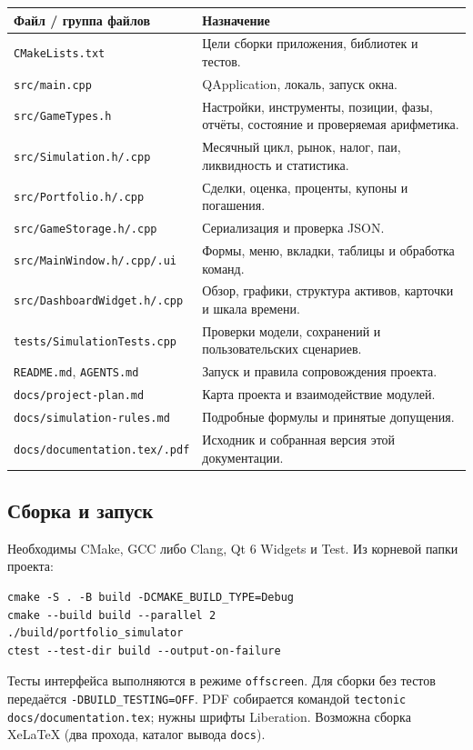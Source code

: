 \documentclass[11pt,a4paper]{article}
\newcommand{\code}[1]{\texttt{#1}}
\begin{document}
\begin{tabularx}{\linewidth}{@{}p{64mm}Y@{}}
\toprule
Файл / группа файлов & Назначение \\\midrule
\code{CMakeLists.txt} & Цели сборки приложения, библиотек и тестов.\\
\code{src/main.cpp} & QApplication, локаль, запуск окна.\\
\code{src/GameTypes.h} & Настройки, инструменты, позиции, фазы, отчёты, состояние и проверяемая арифметика.\\
\code{src/Simulation.h/.cpp} & Месячный цикл, рынок, налог, паи, ликвидность и статистика.\\
\code{src/Portfolio.h/.cpp} & Сделки, оценка, проценты, купоны и погашения.\\
\code{src/GameStorage.h/.cpp} & Сериализация и проверка JSON.\\
\code{src/MainWindow.h/.cpp/.ui} & Формы, меню, вкладки, таблицы и обработка команд.\\
\code{src/DashboardWidget.h/.cpp} & Обзор, графики, структура активов, карточки и шкала времени.\\
\code{tests/SimulationTests.cpp} & Проверки модели, сохранений и пользовательских сценариев.\\
\code{README.md}, \code{AGENTS.md} & Запуск и правила сопровождения проекта.\\
\code{docs/project-plan.md} & Карта проекта и взаимодействие модулей.\\
\code{docs/simulation-rules.md} & Подробные формулы и принятые допущения.\\
\code{docs/documentation.tex/.pdf} & Исходник и собранная версия этой документации.\\
\bottomrule
\end{tabularx}

\subsection*{Сборка и запуск}
Необходимы CMake, GCC либо Clang, Qt 6 Widgets и Test. Из корневой папки проекта:
\begin{verbatim}
cmake -S . -B build -DCMAKE_BUILD_TYPE=Debug
cmake --build build --parallel 2
./build/portfolio_simulator
ctest --test-dir build --output-on-failure
\end{verbatim}
Тесты интерфейса выполняются в режиме \code{offscreen}. Для сборки без тестов передаётся \code{-DBUILD\_TESTING=OFF}. PDF собирается командой \code{tectonic docs/documentation.tex}; нужны шрифты Liberation. Возможна сборка XeLaTeX (два прохода, каталог вывода \code{docs}).
\end{document}
